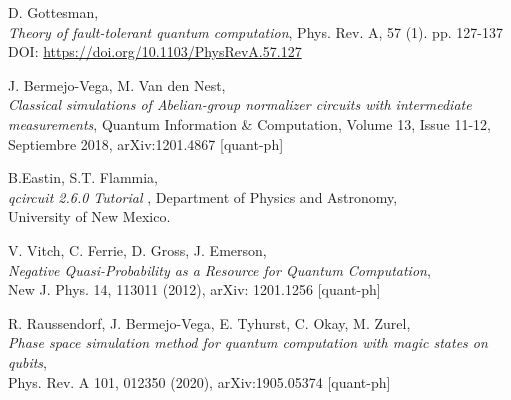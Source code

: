 \documentclass[11pt,a4paper,twoside,pdf]{article}
\numberwithin{equation}{section}
\begin{document}
\begin{thebibliography}{100}
		D. Gottesman, \\
		{\em Theory of fault-tolerant quantum computation}, Phys. Rev. A, 57 (1). pp. 127-137 \\
		DOI: \url{https://doi.org/10.1103/PhysRevA.57.127}			
	
		J. Bermejo-Vega, M. Van den Nest, \\
		{\em Classical simulations of Abelian-group normalizer circuits with intermediate\\ measurements},  Quantum Information \& Computation, Volume 13, Issue 11-12,\\ Septiembre 2018, arXiv:1201.4867 [quant-ph]
			
		B.Eastin, S.T. Flammia,  \\    	
		{\em qcircuit 2.6.0 Tutorial} , Department of Physics and Astronomy, \\
		University of New Mexico.
		
		V. Vitch, C. Ferrie, D. Gross, J. Emerson, \\
		{\em Negative Quasi-Probability as a Resource for Quantum Computation}, \\
		New J. Phys. 14, 113011 (2012), arXiv: 1201.1256 [quant-ph]
		
		R. Raussendorf, J. Bermejo-Vega, E. Tyhurst, C. Okay,  M. Zurel, \\
		{\em Phase space simulation method for quantum computation with magic states on qubits}, \\ 
		Phys. Rev. A 101, 012350 (2020), arXiv:1905.05374 [quant-ph]	
 
\end{thebibliography}


\newpage
\appendix
\end{document}
